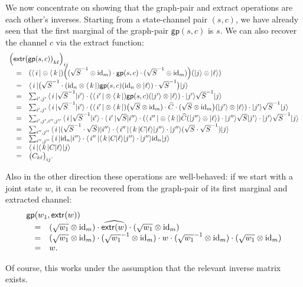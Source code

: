 \documentclass[leqno]{tufte-book} %
\newcommand{\gp}{\mathsf{gp}}
\newcommand{\extr}{\mathsf{extr}}
\newcommand{\ket}[1]{\ensuremath{|#1\rangle}}
\newcommand{\bra}[1]{\langle\,#1\,|}
\newcommand{\idmap}[1][]{\ensuremath{\mathrm{id}_{#1}}}
\begin{document}
{We now concentrate on showing that the graph-pair and extract
operations are each other's inverses.  Starting from a state-channel
pair $(s,c)$, we have already seen that the first marginal of the
graph-pair $\gp(s,c)$ is $s$. We can also recover the channel $c$ via
the extract function:
$$\begin{array}{rcl}
\lefteqn{\Big(\extr\big(\gp(s,c)\big)_{k\ell}\Big)_{ij}}
\\
& = &
(\bra{i}\otimes\bra{k})\Big((\sqrt{S}^{-1}\otimes\idmap[m]) \cdot 
   \gp(s,c) \cdot 
   (\sqrt{S}^{-1}\otimes\idmap[m])\Big)(\ket{j}\otimes\ket{\ell})
\\
& = &
\bra{i}\big(\sqrt{S}^{-1} \cdot 
   (\idmap[n]\otimes\bra{k})\gp(s,c)(\idmap[n]\otimes\ket{\ell}) \cdot 
   \sqrt{S}^{-1}\big)\ket{j}
\\
& = &
\sum_{i',j'}\, \bra{i}\sqrt{S}^{-1}\ket{i'} \cdot 
   (\bra{i'}\otimes\bra{k})\gp(s,c)(\ket{j'}\otimes\ket{\ell}) \cdot 
   \ket{j'}\sqrt{S}^{-1}\ket{j}
\\
& = &
\sum_{i',j'}\, \bra{i}\sqrt{S}^{-1}\ket{i'} \cdot 
   (\bra{i'}\otimes\bra{k})\big(\sqrt{S}\otimes\idmap[m]) \cdot 
   \widehat{C} \cdot (\sqrt{S}\otimes\idmap[m]\big)(\ket{j'}\otimes\ket{\ell}) 
   \cdot \ket{j'}\sqrt{S}^{-1}\ket{j}
\\
& = &
\sum_{i',j',i'',j''}\, \bra{i}\sqrt{S}^{-1}\ket{i'} \cdot \bra{i'}\sqrt{S}\ket{i''} \cdot 
   (\bra{i''}\otimes\bra{k})\widehat{C}(\ket{j''}\otimes\ket{\ell}) 
   \cdot \ket{j''}\sqrt{S}\ket{j'} \cdot \ket{j'}\sqrt{S}^{-1}\ket{j}
\\
& = &
\sum_{i'',j''}\, \bra{i}(\sqrt{S}^{-1}\cdot\sqrt{S})\ket{i''} \cdot 
   \bra{i''}\bra{k}C\ket{\ell}\ket{j''} 
   \cdot \ket{j''}(\sqrt{S}\cdot \sqrt{S}^{-1})\ket{j}
\\
& = &
\sum_{i'',j''}\, \bra{i}\idmap[n]\ket{i''} \cdot 
   \bra{i''}\bra{k}C\ket{\ell}\ket{j''} 
   \cdot \ket{j''}\idmap[n]\ket{j}
\\
& = &
\bra{i}\bra{k}C\ket{\ell}\ket{j} 
\\
& = &
\big(C_{k\ell}\big)_{ij}.
\end{array}$$

Also in the other direction these operations are well-behaved: if we
start with a joint state $w$, it can be recovered from the graph-pair
of its first marginal and extracted channel:
$$\begin{array}{rcl}
\lefteqn{\gp(w_{1}, \extr(w))}
\\
& = &
(\sqrt{w_1}\otimes\idmap[m]) \cdot \widehat{\extr(w)} \cdot 
   (\sqrt{w_1}\otimes\idmap[m])
\\
& = &
(\sqrt{w_1}\otimes\idmap[m]) \cdot (\sqrt{w_{1}}^{-1}\otimes\idmap[m]) \cdot 
   w \cdot (\sqrt{w_{1}}^{-1}\otimes\idmap[m]) \cdot (\sqrt{w_1}\otimes\idmap[m])
\\
& = &
w.
\end{array}$$

\noindent Of course, this works under the assumption that the relevant
inverse matrix exists.
}


\backmatter


\printindex 
\end{document}
